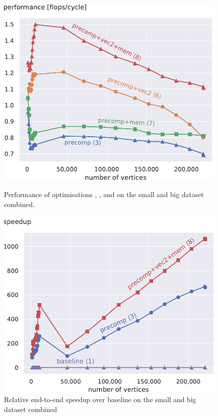 \documentclass[draft,letterpaper]{article}
\begin{document}
\begin{figure}[!t]
\begin{minipage}[t]{\oldlinewidth}\centering
	\includegraphics[width=\linewidth]{img/performance[3][6][7][8]_both.pdf}
	\caption{Performance of optimisations , ,  and  on the small and big dataset combined. \label{cpctVectPerformanceBoth}}
\end{minipage}%
\hspace{7.2mm}
\begin{minipage}[t]{\oldlinewidth}\centering
	\includegraphics[width=\linewidth]{img/speedup[1][3][8]_both.pdf}
	\caption{Relative end-to-end speedup over baseline  on the small and big dataset combined} \label{speedupEndToEnd}
\end{minipage}%
\end{figure}
\end{document}

